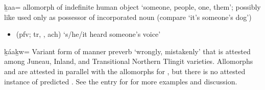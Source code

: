 \begin{morphdesc}[resume*=alphalist]
\item[ḵaa=]
	allomorph of indefinite human object  ‘someone, people, one, them’;
	possibly like  used only as possessor of incorporated noun
		(compare  ‘it’s someone’s dog’)
	\begin{itemize}
	\item	{} (pfv; tr, , ach) ‘s/he/it heard someone’s voice’
	\end{itemize}

\item[ḵáaḵw=]\label{m:ḵáaḵw=}
	Variant form of manner preverb  ‘wrongly, mistakenly’
		that is attested among Juneau, Inland, and Transitional Northern Tlingit varieties.
	Allomorphs  and  are attested in parallel with the allomorphs
		for , but there is no attested instance of predicted .
	See the entry for  for more examples and discussion.


\end{morphdesc}
